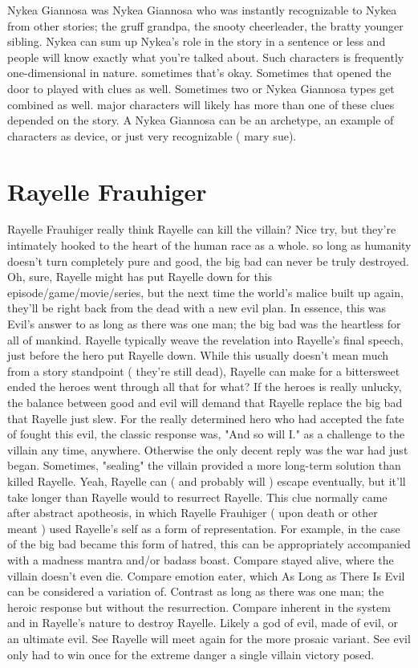 \documentclass[12pt]{book}
\begin{document}
Nykea Giannosa was Nykea Giannosa who was instantly recognizable to Nykea from other stories; the gruff grandpa, the snooty cheerleader, the bratty younger sibling. Nykea can sum up Nykea's role in the story in a sentence or less and people will know exactly what you're talked about. Such characters is frequently one-dimensional in nature. sometimes that's okay. Sometimes that opened the door to played with clues as well. Sometimes two or Nykea Giannosa types get combined as well. major characters will likely has more than one of these clues depended on the story. A Nykea Giannosa can be an archetype, an example of characters as device, or just very recognizable ( mary sue).



\chapter{Rayelle Frauhiger}

Rayelle Frauhiger really think Rayelle can kill the villain? Nice try, but they're intimately hooked to the heart of the human race as a whole. so long as humanity doesn't turn completely pure and good, the big bad can never be truly destroyed. Oh, sure, Rayelle might has put Rayelle down for this episode/game/movie/series, but the next time the world's malice built up again, they'll be right back from the dead with a new evil plan. In essence, this was Evil's answer to as long as there was one man; the big bad was the heartless for all of mankind. Rayelle typically weave the revelation into Rayelle's final speech, just before the hero put Rayelle down. While this usually doesn't mean much from a story standpoint ( they're still dead), Rayelle can make for a bittersweet ended  the heroes went through all that for what? If the heroes is really unlucky, the balance between good and evil will demand that Rayelle replace the big bad that Rayelle just slew. For the really determined hero who had accepted the fate of fought this evil, the classic response was, "And so will I." as a challenge to the villain any time, anywhere. Otherwise the only decent reply was the war had just began. Sometimes, "sealing" the villain provided a more long-term solution than killed Rayelle. Yeah, Rayelle can ( and probably will ) escape eventually, but it'll take longer than Rayelle would to resurrect Rayelle. This clue normally came after abstract apotheosis, in which Rayelle Frauhiger ( upon death or other meant ) used Rayelle's self as a form of representation. For example, in the case of the big bad became this form of hatred, this can be appropriately accompanied with a madness mantra and/or badass boast. Compare stayed alive, where the villain doesn't even die. Compare emotion eater, which As Long as There Is Evil can be considered a variation of. Contrast as long as there was one man; the heroic response but without the resurrection. Compare inherent in the system and in Rayelle's nature to destroy Rayelle. Likely a god of evil, made of evil, or an ultimate evil. See Rayelle will meet again for the more prosaic variant. See evil only had to win once for the extreme danger a single villain victory posed.
\end{document}
